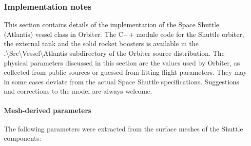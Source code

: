 \documentclass[Orbiter User Manual.tex]{subfiles}
\begin{document}
\subsubsection{Implementation notes}
This section contains details of the implementation of the Space Shuttle
(Atlantis) vessel class in Orbiter. The C++ module code for the Shuttle orbiter,
the external tank and the solid rocket boosters is available in the
.\textbackslash Src\textbackslash Vessel\textbackslash Atlantis subdirectory of
the Orbiter source distribution. The physical parameters discussed in this
section are the values used by Orbiter, as collected from public sources or
guessed from fitting flight parameters. They may in some cases deviate from the
actual Space Shuttle specifications. Suggestions and corrections to the model
are always welcome.


\paragraph{Mesh-derived parameters}
The following parameters were extracted from the surface meshes of the Shuttle
components:
\end{document}
